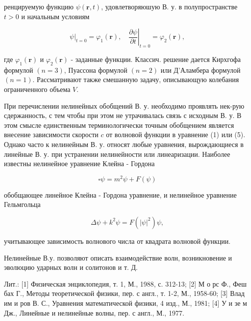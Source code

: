 \documentclass[10pt]{article}
\begin{document}
ренцируемую функцию $\psi(\boldsymbol{r}, t)$, удовлетворяюшую В. у. в полупространстве $t>0$ и начальным условиям



\[

\left.\psi\right|_{t=0}=\varphi_{1}(\boldsymbol{r}),\left.\quad \frac{\partial \psi}{\partial t}\right|_{t=0}=\varphi_{2}(\boldsymbol{r}),

\]



где $\varphi_{1}(\boldsymbol{r})$ и $\varphi_{2}(\boldsymbol{r})$ - заданные функции. Классич. решение дается Кирхгофа формулой $(n=3)$, Пуассона формулой $(n=2)$ или Д'Аламбера формулой $(n=1)$. Рассматривают также смешанную задачу, описывающую колебания ограниченного объема $V$.



При перечислении нелинейных обобщений В. у. необходимо проявлять нек-рую сдержанность, с тем чтобы при этом не утрачивалась связь с исходным В. у. В этом смысле единственным терминологически точным обобщением является внесение зависимости скорости $c$ от волновой функции в уравнение (1) или (5). Однако часто к нелинейным В. у. относят любые уравнения, вырождающиеся в линейные В. у. при устранении нелинейности или линеаризации. Наиболее известны нелинейное уравнение Клейна - Гордона



\[

\square \psi=m^{2} \psi+F(\psi)

\]



обобщающее линейное Клейна - Гордона уравнение, и нелинейное уравнение Гельмгольца



\[

\Delta \psi+k^{2} \psi=F\left(|\psi|^{2}\right) \psi,

\]



учитывающее зависимость волнового числа от квадрата волновой функции.



Нелинейные В.у. позволяют описать взаимодействие волн, возникновение и эволюцию ударных волн и солитонов и т. Д.



Лит.: [1] Физическая энциклопедия, т. 1, М., 1988, с. 312-13; [2] М о рс Ф., Феш бах Г., Методы теоретической физики, пер. с англ., т. 1-2, М., 1958-60; [3] Влад им и ров В. С., Уравнения математической физики, 4 изд., М., 1981; [4] У и зе м Дж., Линейные и нелинейные волны, пер. с англ., М., 1977.
\end{document}
